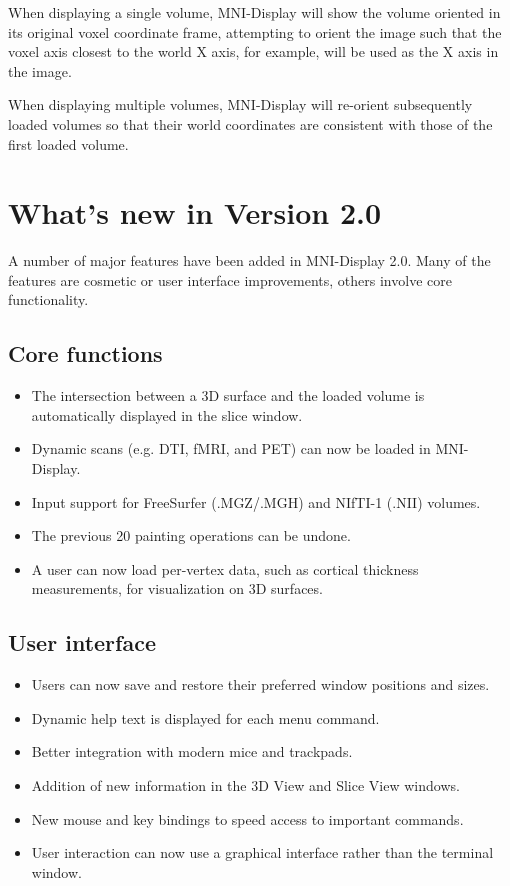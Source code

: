 \documentclass[11pt,letterpaper]{article}
\newcommand{\display}{\mbox{MNI-Display}}
\begin{document}
When displaying a single volume, \display{} will show the volume
oriented in its original voxel coordinate frame, attempting to orient
the image such that the voxel axis closest to the world X axis, for
example, will be used as the X axis in the image.

When displaying multiple volumes, \display{} will re-orient subsequently
loaded volumes so that their world coordinates are consistent with
those of the first loaded volume.

\section{What's new in Version 2.0}

A number of major features have been added in \display{} 2.0. Many of
the features are cosmetic or user interface improvements, others
involve core functionality.

\subsection{Core functions}
\begin{itemize}
\item The intersection between a 3D surface and the loaded volume is automatically displayed in the slice window.
\item Dynamic scans (e.g. DTI, fMRI, and PET) can now be loaded in \display{}.
\item Input support for FreeSurfer (.MGZ/.MGH) and NIfTI-1 (.NII) volumes.
\item The previous 20 painting operations can be undone.
\item A user can now load per-vertex data, such as cortical thickness measurements, for visualization on 3D surfaces.
\end{itemize}

\subsection{User interface}
\begin{itemize}
\item Users can now save and restore their preferred window positions and sizes.
\item Dynamic help text is displayed for each menu command.
\item Better integration with modern mice and trackpads.
\item Addition of new information in the 3D View and Slice View windows.
\item New mouse and key bindings to speed access to important commands.
\item User interaction can now use a graphical interface rather than the
terminal window.
\end{itemize}
\end{document}
